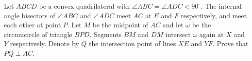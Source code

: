 Let $ABCD$ be a convex quadrilateral with $\angle ABC = \angle ADC < 90^{\circ}$. The internal angle bisectors of $\angle ABC$ and $\angle ADC$ meet $AC$ at $E$ and $F$ respectively, and meet each other at point $P$. Let $M$ be the midpoint of $AC$ and let $\omega$ be the circumcircle of triangle $BPD$. Segments $BM$ and $DM$ intersect $\omega$ again at $X$ and $Y$ respectively. Denote by $Q$ the intersection point of lines $XE$ and $YF$. Prove that $PQ \perp AC$.
